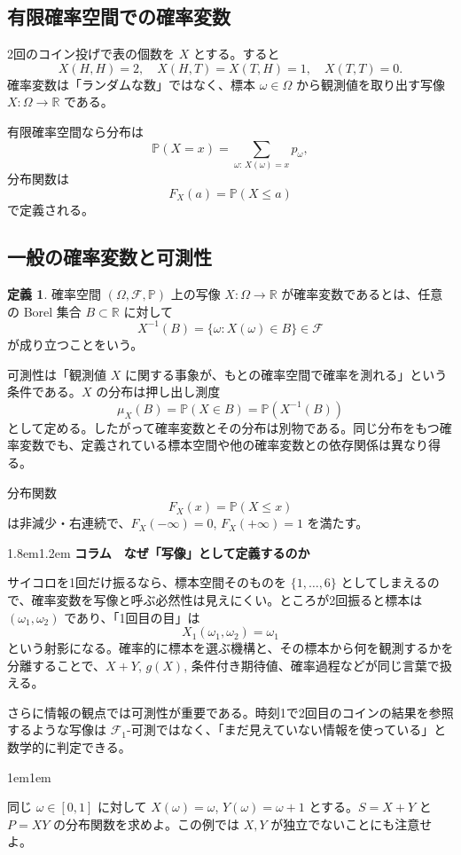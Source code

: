\documentclass[a4paper,11pt,pdflatex,ja=standard,jafont=ipaex-type1,
  magstyle=real,scale=1]{bxjsarticle}
\theoremstyle{definition}
\newtheorem{definition}[theorem]{定義}
\theoremstyle{remark}
\newenvironment{columnnote}[1]
{\par\medskip\begin{adjustwidth}{1.8em}{1.2em}\small\sffamily\color{ColumnText}
{\large\bfseries\color{Accent}コラム　#1}\par\vspace{0.25em}{\color{Accent}\hrule height 0.7pt}\vspace{0.65em}}
{\par\vspace{0.45em}{\color{Accent}\hrule height 0.3pt}\end{adjustwidth}\medskip}
\newenvironment{exerciseblock}
{\par\medskip\begin{adjustwidth}{1em}{1em}\small\sffamily{\bfseries\color{SoftGray}演習・補足}\par\vspace{0.2em}}
{\end{adjustwidth}\medskip}
\newcommand{\Pp}{\mathbb P}
\newcommand{\R}{\mathbb R}
\newcommand{\1}{\mathbf 1}
\begin{document}
\subsection{有限確率空間での確率変数}
2回のコイン投げで表の個数を $X$ とする。すると
\[
X(H,H)=2,
\quad X(H,T)=X(T,H)=1,
\quad X(T,T)=0.
\]
確率変数は「ランダムな数」ではなく、標本 $\omega\in\Omega$ から観測値を取り出す写像 $X:\Omega\to\R$ である。

有限確率空間なら分布は
\[
\Pp(X=x)=\sum_{\omega:\,X(\omega)=x}p_\omega,
\]
分布関数は
\[
F_X(a)=\Pp(X\le a)
\]
で定義される。

\subsection{一般の確率変数と可測性}
\begin{definition}
確率空間 $(\Omega,\mathcal F,\Pp)$ 上の写像 $X:\Omega\to\R$ が確率変数であるとは、任意の Borel 集合 $B\subset\R$ に対して
\[
X^{-1}(B)=\{\omega:X(\omega)\in B\}\in\mathcal F
\]
が成り立つことをいう。
\end{definition}

可測性は「観測値 $X$ に関する事象が、もとの確率空間で確率を測れる」という条件である。$X$ の分布は押し出し測度
\[
\mu_X(B)=\Pp(X\in B)=\Pp(X^{-1}(B))
\]
として定める。したがって確率変数とその分布は別物である。同じ分布をもつ確率変数でも、定義されている標本空間や他の確率変数との依存関係は異なり得る。

分布関数
\[
F_X(x)=\Pp(X\le x)
\]
は非減少・右連続で、$F_X(-\infty)=0$, $F_X(+\infty)=1$ を満たす。

\begin{columnnote}{なぜ「写像」として定義するのか}
サイコロを1回だけ振るなら、標本空間そのものを $\{1,\dots,6\}$ としてしまえるので、確率変数を写像と呼ぶ必然性は見えにくい。ところが2回振ると標本は $(\omega_1,\omega_2)$ であり、「1回目の目」は
\[
X_1(\omega_1,\omega_2)=\omega_1
\]
という射影になる。確率的に標本を選ぶ機構と、その標本から何を観測するかを分離することで、$X+Y$, $g(X)$, 条件付き期待値、確率過程などが同じ言葉で扱える。

さらに情報の観点では可測性が重要である。時刻1で2回目のコインの結果を参照するような写像は $\mathcal F_1$-可測ではなく、「まだ見えていない情報を使っている」と数学的に判定できる。
\end{columnnote}

\begin{exerciseblock}
同じ $\omega\in[0,1]$ に対して $X(\omega)=\omega$, $Y(\omega)=\omega+1$ とする。$S=X+Y$ と $P=XY$ の分布関数を求めよ。この例では $X,Y$ が独立でないことにも注意せよ。
\end{exerciseblock}
\end{document}
